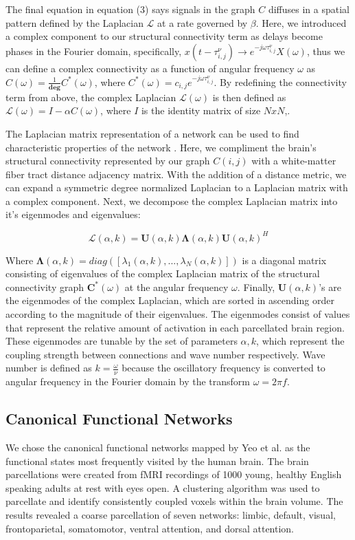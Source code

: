 \documentclass{article}
\begin{document}
The final equation in equation (3) says signals in the graph $C$ diffuses in a spatial pattern defined by the Laplacian $\mathcal{L}$ at a rate governed by $\beta$. Here, we introduced a complex component to our structural connectivity term as delays become phases in the Fourier domain, specifically, $x(t-\tau^{\nu}_{i,j}) \to e^{-j\omega \tau^{\nu}_{i,j}} X(\omega)$, thus we can define a complex connectivity as a function of angular frequency $\omega$ as $C(\omega) = \frac{1}{\pmb{deg}}C^{*}(\omega)$, where $C^{*}(\omega) = c_{i,j}e^{-j\omega \tau^{\nu}_{i,j}}$. By redefining the connectivity term from above, the complex Laplacian $\mathcal{L}(\omega)$ is then defined as $\mathcal{L}(\omega) = I - \alpha C(\omega)$, where $I$ is the identity matrix of size $N x N$,.

The Laplacian matrix representation of a network can be used to find characteristic properties of the network \cite{Stewart1999}. Here, we compliment the brain's structural connectivity represented by our graph $C(i,j)$ with a white-matter fiber tract distance adjacency matrix. With the addition of a distance metric, we can expand a symmetric degree normalized Laplacian to a Laplacian matrix with a complex component. Next, we decompose the complex Laplacian matrix into it's eigenmodes and eigenvalues:

\begin{equation}
    \bm{\mathcal{L}}(\alpha, k) = \bm{U}(\alpha, k)\bm{\Lambda}(\alpha, k)\bm{U}(\alpha, k)^{H}
\end{equation}

Where $\bm{\Lambda}(\alpha, k) = diag([\lambda_{1}(\alpha, k), ... , \lambda_{N}(\alpha, k)])$ is a diagonal matrix consisting of eigenvalues of the complex Laplacian matrix of the structural connectivity graph $\bm{C^*}(\omega)$ at the angular frequency $\omega$. Finally, $\bm{U}(\alpha, k)$'s are the eigenmodes of the complex Laplacian, which are sorted in ascending order according to the magnitude of their eigenvalues. The eigenmodes consist of values that represent the relative amount of activation in each parcellated brain region. These eigenmodes are tunable by the set of parameters ${\alpha, k}$, which represent the coupling strength between connections and wave number respectively. Wave number is defined as $k = \frac{\omega}{\nu}$ because the oscillatory frequency is converted to angular frequency in the Fourier domain by the transform $\omega = 2 \pi f$.

\subsection{Canonical Functional Networks}
We chose the canonical functional networks mapped by Yeo et al. \cite{Yeo2011} as the functional states most frequently visited by the human brain. The brain parcellations were created from fMRI recordings of 1000 young, healthy English speaking adults at rest with eyes open. A clustering algorithm was used to parcellate and identify consistently coupled voxels within the brain volume. The results revealed a coarse parcellation of seven networks: limbic, default, visual, frontoparietal, somatomotor, ventral attention, and dorsal attention. 
\end{document}
